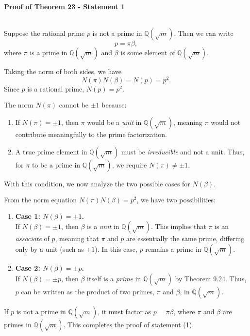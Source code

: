 \documentclass{article}
\newenvironment{proofbox}
  {\begin{mdframed}[linewidth=1pt,linecolor=black,backgroundcolor=white]\noindent\ignorespaces}
  {\end{mdframed}}
\begin{document}
\textbf{Proof of Theorem 23 - Statement 1}\\\\
\begin{proofbox}
    Suppose the rational prime $p$ is not a prime in $\mathbb{Q}(\sqrt{m})$. Then we can write
    \[
    p = \pi \beta,
    \]
    where $\pi$ is a prime in $\mathbb{Q}(\sqrt{m})$ and $\beta$ is some element of $\mathbb{Q}(\sqrt{m})$.
    
    Taking the norm of both sides, we have
    \[
    N(\pi) N(\beta) = N(p) = p^2.
    \]
    Since $p$ is a rational prime, $N(p) = p^2$.
    
    The norm $N(\pi)$ cannot be $\pm 1$ because:
    \begin{enumerate}
        \item If $N(\pi) = \pm 1$, then $\pi$ would be a \textit{unit} in $\mathbb{Q}(\sqrt{m})$, meaning $\pi$ would not contribute meaningfully to the prime factorization.
        \item A true prime element in $\mathbb{Q}(\sqrt{m})$ must be \textit{irreducible} and not a unit. Thus, for $\pi$ to be a prime in $\mathbb{Q}(\sqrt{m})$, we require $N(\pi) \neq \pm 1$.
    \end{enumerate}
    
    With this condition, we now analyze the two possible cases for $N(\beta)$.
    

    From the norm equation \( N(\pi) N(\beta) = p^2 \), we have two possibilities:
    \begin{enumerate}
        \item \textbf{Case 1: $N(\beta) = \pm 1$.}\\
        If $N(\beta) = \pm 1$, then $\beta$ is a \textit{unit} in $\mathbb{Q}(\sqrt{m})$. This implies that $\pi$ is an \textit{associate} of $p$, meaning that $\pi$ and $p$ are essentially the same prime, differing only by a unit (such as $\pm 1$). In this case, $p$ remains a prime in $\mathbb{Q}(\sqrt{m})$.
    
        \item \textbf{Case 2: $N(\beta) = \pm p$.}\\
        If $N(\beta) = \pm p$, then $\beta$ itself is a \textit{prime} in $\mathbb{Q}(\sqrt{m})$ by Theorem 9.24. Thus, $p$ can be written as the product of two primes, $\pi$ and $\beta$, in $\mathbb{Q}(\sqrt{m})$.
    \end{enumerate}
    
   
    If $p$ is not a prime in $\mathbb{Q}(\sqrt{m})$, it must factor as $p = \pi \beta$, where $\pi$ and $\beta$ are primes in $\mathbb{Q}(\sqrt{m})$. This completes the proof of statement (1).

\end{proofbox}
\end{document}
